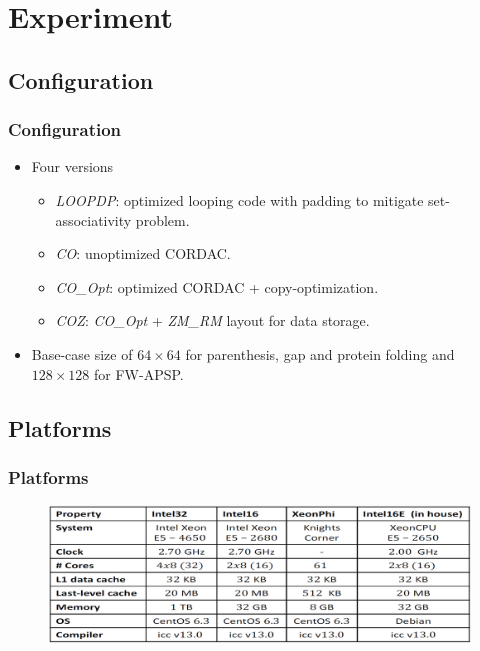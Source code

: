 \section{Experiment}

\subsection{Configuration}
\begin{frame}
    \frametitle{Configuration}
    \begin{itemize}
    	\item Four versions
		    \begin{itemize}
				\item \textit{LOOPDP}: optimized looping code with padding
					to mitigate set-associativity problem.
				\item \textit{CO}: unoptimized CORDAC.
				\item \textit{CO\_Opt}: optimized CORDAC + copy-optimization.
				\item \textit{COZ}: \textit{CO\_Opt} + \textit{ZM\_RM} 
					layout for data storage.
			\end{itemize}
		\item Base-case size of $64 \times 64$ for parenthesis, gap and protein 
			folding and $128 \times 128$ for FW-APSP.
	\end{itemize}
\end{frame}

\subsection{Platforms}
\begin{frame}
    \frametitle{Platforms}
    \begin{figure}
		\includegraphics[scale=0.3]{figure/fig-platforms.png}
	\end{figure}
\end{frame}

